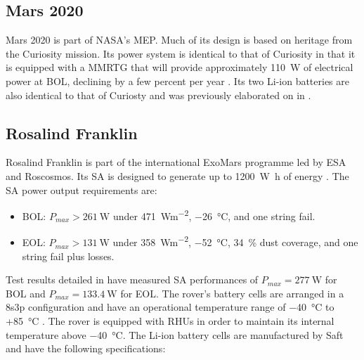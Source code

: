 \subsection{Mars 2020}
\label{sec:StateOfTheArt:PlannedMissions:Mars2020}

Mars 2020 is part of \ac{NASA}'s \ac{MEP}. Much of its design is based on heritage from the Curiosity mission. Its power system is identical to that of Curiosity in that it is equipped with a \ac{MMRTG} that will provide approximately \SI{110}{\watt} of electrical power at \ac{BOL}, declining by a few percent per year . Its two \ac{Li-ion} batteries are also identical to that of Curiosty and was previously elaborated on in .

\subsection{Rosalind Franklin}
\label{sec:StateOfTheArt:PlannedMissions:RosalindFranklin}

Rosalind Franklin is part of the international ExoMars programme led by \ac{ESA} and Roscosmos. Its \ac{SA} is designed to generate up to \SI{1200}{\watt\hour} of energy . The \ac{SA} power output requirements are:

\begin{itemize}
    \item \ac{BOL}: $P_{max} > \SI{261}{\watt}$ under \SI{471}{Wm^{-2}}, \SI{-26}{\celsius}, and one string fail.
    \item \ac{EOL}: $P_{max} > \SI{131}{\watt}$ under \SI{358}{Wm^{-2}}, \SI{-52}{\celsius}, \SI{34}{\percent} dust coverage, and one string fail plus losses.
\end{itemize}

Test results detailed in  have measured \ac{SA} performances of $P_{max} = \SI{277}{\watt}$ for \ac{BOL} and $P_{max} = \SI{133.4}{\watt}$ for \ac{EOL}. The rover's battery cells are arranged in a 8s3p configuration and have an operational temperature range of \SI{-40}{\celsius} to +\SI{85}{\celsius} . The rover is equipped with \acp{RHU} in order to maintain its internal temperature above \SI{-40}{\celsius}. The \ac{Li-ion} battery cells are manufactured by Saft and have the following specifications:

